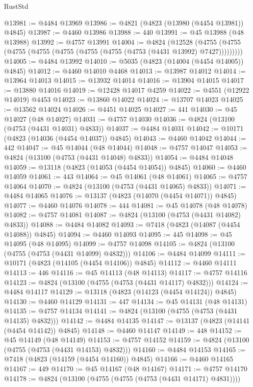 \begin{lexlean}{RustStd}
\begin{coremodule}
@13981 := @4484 @13969
@13986 := @4821 (@4823 (@13980 (@4454 @13981)) @4845)
@13987 := @4460 @13986
@13988 := 440
@13991 := @45 @13988 (@48 @13988)
@13992 := @4757 @13991
@14004 := @4824
    (@12528 (@4755 (@4755 (@4755 (@4755 (@4755 (@4755 (@4755 (@4753 (@4431 @13992) @7427)))))))))
@14005 := @4484 @13992
@14010 := @5035 (@4823 (@14004 (@4454 @14005)) @4845)
@14012 := @4460 @14010 @4468
@14013 := @13987 @14012
@14014 := @13964 @14013
@14015 := @13932 @14014
@14016 := @13904 @14015
@14017 := @13880 @14016
@14019 := @12428 @14017 @4259
@14022 := @4551 (@12922 @14019) @4453
@14023 := @13860 @14022
@14024 := @13707 @14023
@14025 := @13562 @14024
@14026 := @4451 @14025
@14027 := 441
@14030 := @45 @14027 (@48 @14027)
@14031 := @4757 @14030
@14036 := @4824 (@13100 (@4753 (@4431 @14031) @4833))
@14037 := @4484 @14031
@14042 := @10171 (@4823 (@14036 (@4454 @14037)) @4845)
@14043 := @4460 @14042
@14044 := 442
@14047 := @45 @14044 (@48 @14044)
@14048 := @4757 @14047
@14053 := @4824 (@13100 (@4753 (@4431 @14048) @4833))
@14054 := @4484 @14048
@14059 := @13118 (@4823 (@14053 (@4454 @14054)) @4845)
@14060 := @4460 @14059
@14061 := 443
@14064 := @45 @14061 (@48 @14061)
@14065 := @4757 @14064
@14070 := @4824 (@13100 (@4753 (@4431 @14065) @4833))
@14071 := @4484 @14065
@14076 := @13137 (@4823 (@14070 (@4454 @14071)) @4845)
@14077 := @4460 @14076
@14078 := 444
@14081 := @45 @14078 (@48 @14078)
@14082 := @4757 @14081
@14087 := @4824 (@13100 (@4753 (@4431 @14082) @4833))
@14088 := @4484 @14082
@14093 := @7418 (@4823 (@14087 (@4454 @14088)) @4845)
@14094 := @4460 @14093
@14095 := 445
@14098 := @45 @14095 (@48 @14095)
@14099 := @4757 @14098
@14105 := @4824 (@13100 (@4755 (@4753 (@4431 @14099) @4832)))
@14106 := @4484 @14099
@14111 := @10171 (@4823 (@14105 (@4454 @14106)) @4845)
@14112 := @4460 @14111
@14113 := 446
@14116 := @45 @14113 (@48 @14113)
@14117 := @4757 @14116
@14123 := @4824 (@13100 (@4755 (@4753 (@4431 @14117) @4832)))
@14124 := @4484 @14117
@14129 := @13118 (@4823 (@14123 (@4454 @14124)) @4845)
@14130 := @4460 @14129
@14131 := 447
@14134 := @45 @14131 (@48 @14131)
@14135 := @4757 @14134
@14141 := @4824 (@13100 (@4755 (@4753 (@4431 @14135) @4832)))
@14142 := @4484 @14135
@14147 := @13137 (@4823 (@14141 (@4454 @14142)) @4845)
@14148 := @4460 @14147
@14149 := 448
@14152 := @45 @14149 (@48 @14149)
@14153 := @4757 @14152
@14159 := @4824 (@13100 (@4755 (@4753 (@4431 @14153) @4832)))
@14160 := @4484 @14153
@14165 := @7418 (@4823 (@14159 (@4454 @14160)) @4845)
@14166 := @4460 @14165
@14167 := 449
@14170 := @45 @14167 (@48 @14167)
@14171 := @4757 @14170
@14178 := @4824 (@13100 (@4755 (@4755 (@4753 (@4431 @14171) @4831))))

\end{coremodule}
\end{lexlean}
